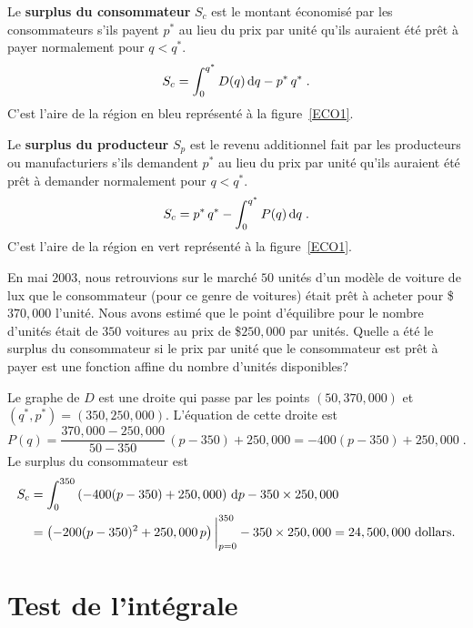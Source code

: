 {

Le {\bfseries surplus du consommateur}
$S_c$ est le montant économisé par les consommateurs s'ils payent
$p^\ast$ au lieu du prix par unité qu'ils auraient été prêt à payer
normalement pour $q < q^\ast$.
\[
S_c = \int_0^{q^\ast} D(q) \,\mathrm{d}q - p^\ast \, q^\ast \; .
\]
C'est l'aire de la région en bleu représenté à la figure~\ref{ECO1}. 

Le {\bfseries surplus du producteur}
$S_p$ est le revenu additionnel fait par les producteurs ou
manufacturiers s'ils demandent $p^\ast$ au lieu du prix par unité
qu'ils auraient été prêt à demander normalement pour $q < q^\ast$.
\[
S_c = p^\ast \, q^\ast - \int_0^{q^\ast} P(q) \,\mathrm{d}q \; .
\]
C'est l'aire de la région en vert représenté à la figure~\ref{ECO1}. 

\begin{egg}
En mai $2003$, nous retrouvions sur le marché $50$ unités d'un
modèle de voiture de lux que le consommateur (pour ce genre de voitures)
était prêt à acheter pour \$$370,000$ l'unité.  Nous avons estimé que le point
d'équilibre pour le nombre d'unités était de $350$ voitures au prix de
\$$250,000$ par unités.  Quelle a été le surplus du consommateur si le
prix par unité que le consommateur est prêt à payer est une fonction
affine du nombre d'unités disponibles?

Le graphe de $D$ est une droite qui passe par les points
$(50, 370,000)$ et \\
$(q^\ast, p^\ast) = (350, 250,000)$.
L'équation de cette droite est
\[
P(q) = \frac{370,000-250,000}{50-350} \, (p-350) + 250,000
= -400 (p-350) + 250,000 \; .
\]
Le surplus du consommateur est
\begin{align*}
S_c &= \int_0^{350} \left(-400 (p-350) + 250,000\right)\,\mathrm{d}p -
350\times 250,000 \\
&= \left(-200 (p-350)^2 + 250,000 \, p \right)\bigg|_{p=0}^{350}
- 350\times 250,000
= 24,500,000 \text{ dollars}.
\end{align*}
\end{egg}

\section{Test de l'intégrale \eng}\label{integralTest}

}

